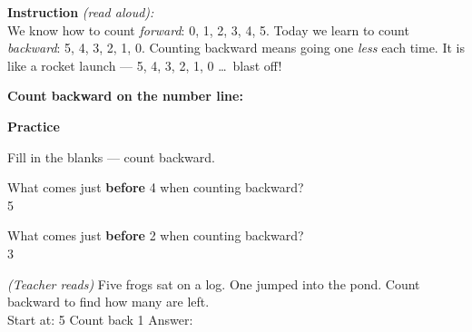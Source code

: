 \documentclass[12pt,letterpaper]{article}
\begin{document}

\begin{instructbox}
\noindent\textbf{\color{sd-blue}Instruction} \textit{(read aloud):}\\[4pt]
We know how to count \textit{forward}: 0, 1, 2, 3, 4, 5.
Today we learn to count \textit{backward}: 5, 4, 3, 2, 1, 0.
Counting backward means going one \textit{less} each time.
It is like a rocket launch — 5, 4, 3, 2, 1, 0 \ldots\ blast off!
\end{instructbox}

\vspace{8pt}
\noindent\textbf{\color{sd-blue}Count backward on the number line:}
\vspace{8pt}

\begin{center}
\end{center}

\goldrule
\noindent\textbf{\color{sd-blue}Practice}
\vspace{6pt}

\prob Fill in the blanks — count backward.\\[6pt]
\hspace{1cm}{\Large 5 \quad \ansblank \quad 3 \quad \ansblank \quad 1 \quad \ansblank}

\vspace{10pt}
\prob What comes just \textbf{before} 4 when counting backward?\\[4pt]
\hspace{1cm}5 \quad \ansblank {}

\vspace{10pt}
\prob What comes just \textbf{before} 2 when counting backward?\\[4pt]
\hspace{1cm}3 \quad \ansblank {}

\vspace{10pt}
\prob \textit{(Teacher reads)} Five frogs sat on a log.
One jumped into the pond. Count backward to find how many are left.\\[4pt]
\hspace{1cm}Start at: 5 \quad Count back 1 \quad Answer: \ansblank
\end{document}
